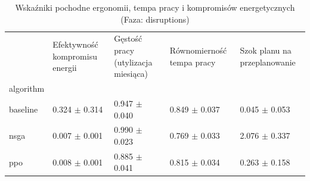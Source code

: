 
\begin{table}[htbp]
\caption{Wskaźniki pochodne ergonomii, tempa pracy i kompromisów energetycznych (Faza: disruptions)}
\label{tab:derived_metrics_disruptions}
\begin{tabular}{lllll}
\toprule
 & Efektywność kompromisu energii & Gęstość pracy (utylizacja miesiąca) & Równomierność tempa pracy & Szok planu na przeplanowanie \\
algorithm &  &  &  &  \\
\midrule
baseline & 0.324 $\pm$ 0.314 & 0.947 $\pm$ 0.040 & 0.849 $\pm$ 0.037 & 0.045 $\pm$ 0.053 \\
nsga & 0.007 $\pm$ 0.001 & 0.990 $\pm$ 0.023 & 0.769 $\pm$ 0.033 & 2.076 $\pm$ 0.337 \\
ppo & 0.008 $\pm$ 0.001 & 0.885 $\pm$ 0.041 & 0.815 $\pm$ 0.034 & 0.263 $\pm$ 0.158 \\
\bottomrule
\end{tabular}
\end{table}
